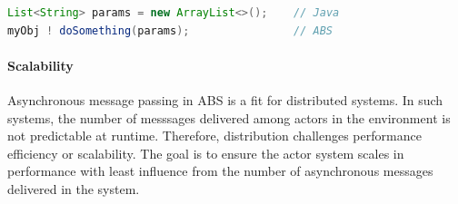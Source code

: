 \begin{lstlisting}[float=h,language=Java,caption=Using Java in ABS,label=lst:abs:java]
List<String> params = new ArrayList<>();    // Java
myObj ! doSomething(params);                // ABS
\end{lstlisting}

\paragraph{Scalability} 
Asynchronous message passing in ABS is a fit for distributed systems.
In such systems, the number of messsages delivered among actors in the 
environment is not predictable at runtime.
Therefore, distribution challenges performance efficiency or scalability.
The goal is to ensure the actor system scales in performance with least 
influence from the number of asynchronous messages delivered in the system.

